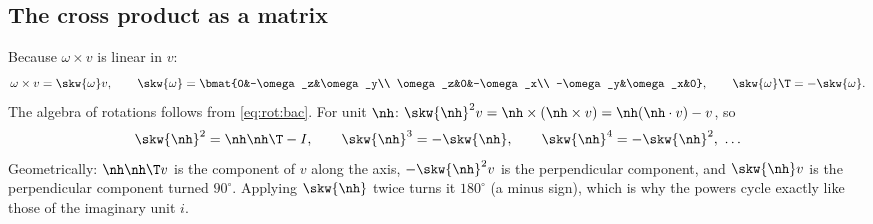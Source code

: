 \subsection{The cross product as a matrix}\label{sec:rot:skew}\label{sec:rot:cross-product-matrix}
Because $\omega\times v$ is linear in $v$:
\[
\omega\times v=\skw{\omega}v,\qquad \skw{\omega}=\bmat{0&-\omega_z&\omega_y\\ \omega_z&0&-\omega_x\\ -\omega_y&\omega_x&0},\qquad \skw{\omega}\T=-\skw{\omega}.
\]
The algebra of rotations follows from \eqref{eq:rot:bac}. For unit $\nh$: $\skw{\nh}^2v=\nh\times(\nh\times v)=\nh(\nh\cdot v)-v$, so
\begin{equation}
\skw{\nh}^2=\nh\nh\T-I,\qquad \skw{\nh}^3=-\skw{\nh},\qquad \skw{\nh}^4=-\skw{\nh}^2,\ \dots\label{eq:rot:skewpow}
\end{equation}
Geometrically: $\nh\nh\T v$ is the component of $v$ along the axis, $-\skw{\nh}^2v$ is the perpendicular component, and $\skw{\nh}v$ is the perpendicular component turned $90^\circ$. Applying $\skw{\nh}$ twice turns it $180^\circ$ (a minus sign), which is why the powers cycle exactly like those of the imaginary unit $i$.
